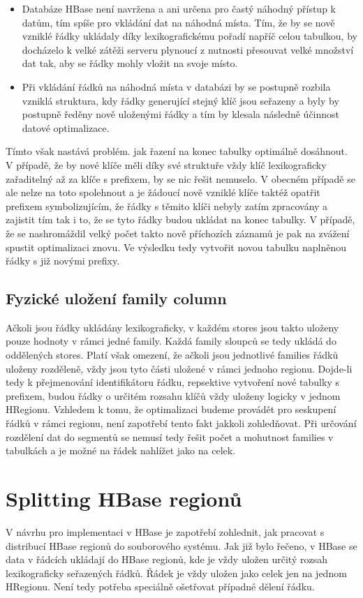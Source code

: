 \documentclass[thesis=M,czech]{FITthesis}[2012/06/26]
\begin{document}
\begin{itemize}
\item Databáze HBase není navržena a ani určena pro častý náhodný přístup k datům, tím spíše pro vkládání dat na náhodná místa. Tím, že by se nově vzniklé řádky ukládaly díky lexikografickému pořadí napříč celou tabulkou, by docházelo k velké zátěži serveru plynoucí z nutnosti přesouvat velké množství dat tak, aby se řádky mohly vložit na svoje místo.
 
\item Při vkládání řádků na náhodná místa v databázi by se postupně rozbila vzniklá struktura, kdy řádky generující stejný klíč jsou seřazeny a byly by postupně ředěny nově uloženými řádky a tím by klesala následně účinnost datové optimalizace. 
\end{itemize}

Tímto však nastává problém. jak řazení na konec tabulky optimálně dosáhnout. V případě, že by nové klíče měli díky své struktuře vždy klíč lexikograficky zařaditelný až za klíče s prefixem, by se nic řešit nemuselo. V obecném případě se ale nelze na toto spolehnout a je žádoucí nově vzniklé klíče taktéž opatřit prefixem symbolizujícím, že řádky s těmito klíči nebyly zatím zpracovány a zajistit tím tak i to, že se tyto řádky budou ukládat na konec tabulky. V případě, že se nashromáždil velký počet takto nově příchozích záznamů je pak na zvážení spustit optimalizaci znovu. Ve výsledku tedy vytvořit novou tabulku naplněnou řádky s již novými prefixy. 

\subsection{Fyzické uložení family column}
Ačkoli jsou řádky ukládány lexikograficky, v každém stores jsou takto uloženy pouze hodnoty v rámci jedné family. Každá family sloupců se tedy ukládá do oddělených stores. Platí však omezení, že ačkoli jsou jednotlivé families řádků uloženy rozděleně, vždy jsou tyto části uložené v rámci jednoho regionu. Dojde-li tedy k přejmenování identifikátoru řádku, repsektive vytvoření nové tabulky s prefixem, budou řádky o určitém rozsahu klíčů vždy uloženy logicky v jednom HRegionu. Vzhledem k tomu, že optimalizaci budeme provádět pro seskupení řádků v rámci regionu, není zapotřebí tento fakt jakkoli zohledňovat. Při určování rozdělení dat do segmentů se nemusí tedy řešit počet a mohutnost families v tabulkách a je možné na řádek nahlížet jako na celek.


\section{Splitting HBase regionů}
V návrhu pro implementaci v HBase je zapotřebí zohlednit, jak pracovat s distribucí HBase regionů do souborového systému. Jak již bylo řečeno, v HBase se data v řádcích ukládají do HBase regionů, kde je vždy uložen určitý rozsah lexikograficky seřazených řádků. Řádek je vždy uložen jako celek jen na jednom HRegionu. Není tedy potřeba speciálně ošetřovat případné dělení řádku. 
\end{document}
